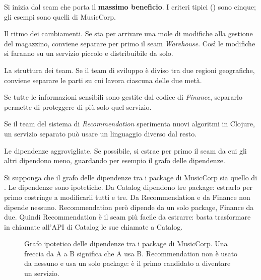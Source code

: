 Si inizia dal seam che porta il \textbf{massimo beneficio}. I criteri tipici () sono cinque; gli esempi
sono quelli di MusicCorp.
\begin{description}[leftmargin=0pt, style=unboxed]
  \item[Pace of change.] Il ritmo dei cambiamenti. Se sta per arrivare una mole di modifiche alla gestione del
    magazzino, conviene separare per primo il seam \emph{Warehouse}. Così le modifiche si faranno su un servizio
    piccolo e distribuibile da solo.
  \item[Team structure.] La struttura dei team. Se il team di sviluppo è diviso tra due regioni geografiche, conviene
    separare le parti su cui lavora ciascuna delle due metà.
  \item[Security.] Se tutte le informazioni sensibili sono gestite dal codice di \emph{Finance}, separarlo permette di
    proteggere di più solo quel servizio.
  \item[Technology.] Se il team del sistema di \emph{Recommendation} sperimenta nuovi algoritmi in Clojure, un servizio
    separato può usare un linguaggio diverso dal resto.
  \item[Tangled dependencies.] Le dipendenze aggrovigliate. Se possibile, si estrae per primo il seam da cui gli altri
    dipendono meno, guardando per esempio il grafo delle dipendenze.
\end{description}

\begin{esempio}
Si supponga che il grafo delle dipendenze tra i package di MusicCorp sia quello di . Le
dipendenze sono ipotetiche. Da Catalog dipendono tre package: estrarlo per primo costringe a modificarli tutti e tre.
Da Recommendation e da Finance non dipende nessuno. Recommendation però dipende da un solo package, Finance da due.
Quindi Recommendation è il seam più facile da estrarre: basta trasformare in chiamate all'API di Catalog le sue
chiamate a Catalog.
\end{esempio}

\begin{figure}[ht]
\centering
{}
\caption{Grafo ipotetico delle dipendenze tra i package di MusicCorp. Una freccia da A a B significa che A usa B.
Recommendation non è usato da nessuno e usa un solo package: è il primo candidato a diventare un servizio.}
\label{fig:split-dipendenze}
\end{figure}

